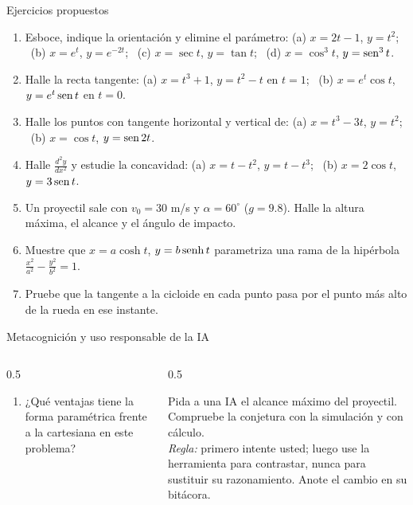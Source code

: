 \documentclass[10pt,aspectratio=169]{beamer}
\begin{document}
\begin{frame}{Ejercicios propuestos}
  \small
  \begin{ejercicio}
    \begin{enumerate}
      \item Esboce, indique la orientación y elimine el parámetro: (a) $x=2t-1$, $y=t^2$; \ (b) $x=e^t$, $y=e^{-2t}$; \ (c) $x=\sec t$, $y=\tan t$;
        \ (d) $x=\cos^3t$, $y=\operatorname{sen}^3t$.
      \item Halle la recta tangente: (a) $x=t^3+1$, $y=t^2-t$ en $t=1$; \ (b) $x=e^t\cos t$, $y=e^t\operatorname{sen} t$ en $t=0$.
      \item Halle los puntos con tangente horizontal y vertical de: (a) $x=t^3-3t$, $y=t^2$; \ (b) $x=\cos t$, $y=\operatorname{sen}2t$.
      \item Halle $\frac{d^2y}{dx^2}$ y estudie la concavidad: (a) $x=t-t^2$, $y=t-t^3$; \ (b) $x=2\cos t$, $y=3\operatorname{sen} t$.
      \item Un proyectil sale con $v_0=30$ m/s y $\alpha=60^\circ$ ($g=9.8$). Halle la altura máxima, el alcance y el ángulo de impacto.
      \item Muestre que $x=a\cosh t$, $y=b\operatorname{senh} t$ parametriza una rama de la hipérbola $\frac{x^2}{a^2}-\frac{y^2}{b^2}=1$.
      \item Pruebe que la tangente a la cicloide en cada punto pasa por el punto más alto de la rueda en ese instante.
    \end{enumerate}
  \end{ejercicio}
\end{frame}

\begin{frame}{Metacognición y uso responsable de la IA}
  \small
  \begin{columns}[t]
    \begin{column}{0.5\textwidth}
      \begin{metacog}
        \begin{enumerate}
          \metacomun
          \item ¿Qué ventajas tiene la forma paramétrica frente a la cartesiana en este problema?
        \end{enumerate}
      \end{metacog}
    \end{column}
    \begin{column}{0.5\textwidth}
      \begin{iabox}
        Pida a una IA el alcance máximo del proyectil. Compruebe la conjetura con la simulación y con cálculo.\\[2pt]
        \textit{Regla:} primero intente usted; luego use la herramienta para contrastar, nunca para sustituir su razonamiento. Anote el cambio en su bitácora.
      \end{iabox}
    \end{column}
  \end{columns}
\end{frame}
\end{document}
